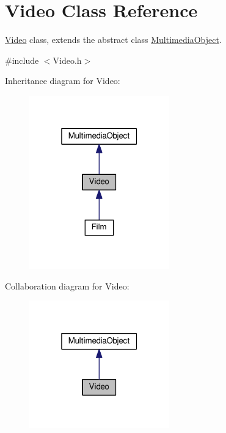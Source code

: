 \hypertarget{classVideo}{}\section{Video Class Reference}
\label{classVideo}


\hyperlink{classVideo}{Video} class, extends the abstract class \hyperlink{classMultimediaObject}{Multimedia\+Object}.  




{\ttfamily \#include $<$Video.\+h$>$}



Inheritance diagram for Video\+:
\nopagebreak
\begin{figure}[H]
\begin{center}
\leavevmode
\includegraphics[width=172pt]{classVideo__inherit__graph}
\end{center}
\end{figure}


Collaboration diagram for Video\+:
\nopagebreak
\begin{figure}[H]
\begin{center}
\leavevmode
\includegraphics[width=172pt]{classVideo__coll__graph}
\end{center}
\end{figure}
